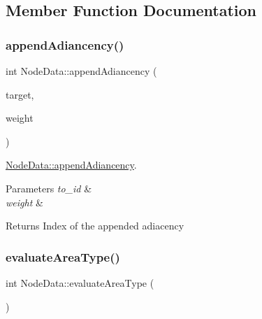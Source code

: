 \subsection{Member Function Documentation}
\mbox{\label{class_node_data_aa74aee107185352987907fc2e9f06e4a}} 
\subsubsection{\texorpdfstring{appendAdiancency()}{appendAdiancency()}}
{\footnotesize\ttfamily int Node\+Data\+::append\+Adiancency (\begin{DoxyParamCaption}\item[{std\+::shared\+\_\+ptr$<$ \mbox{\hyperlink{class_node_data}{Node\+Data}} $>$}]{target,  }\item[{double}]{weight }\end{DoxyParamCaption})}



\mbox{\hyperlink{class_node_data_aa74aee107185352987907fc2e9f06e4a}{Node\+Data\+::append\+Adiancency}}. 


\begin{DoxyParams}{Parameters}
{\em to\+\_\+id} & \\
\hline
{\em weight} & \\
\hline
\end{DoxyParams}
\begin{DoxyReturn}{Returns}
Index of the appended adiacency 
\end{DoxyReturn}
\mbox{\label{class_node_data_ac1a8b1d3946f4103ccbb1a131ca0e87a}} 
\subsubsection{\texorpdfstring{evaluateAreaType()}{evaluateAreaType()}}
{\footnotesize\ttfamily int Node\+Data\+::evaluate\+Area\+Type (\begin{DoxyParamCaption}{ }\end{DoxyParamCaption})\hspace{0.3cm}{\ttfamily [inline]}}

\mbox{\label{class_node_data_a1f6857f859ac1fecf79db94b7ede82c2}} 
